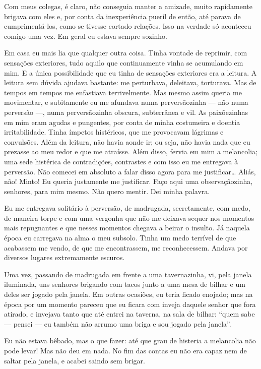 Com meus colegas, é claro, não conseguia manter a amizade, muito
rapidamente brigava com eles e, por conta da inexperiência pueril de
então, até parava de cumprimentá-los, como se tivesse cortado relações.
Isso na verdade só aconteceu comigo uma vez. Em geral eu estava sempre
sozinho.

Em casa eu mais lia que qualquer outra coisa. Tinha vontade de reprimir,
com sensações exteriores, tudo aquilo que continuamente vinha se
acumulando em mim. E a única possibilidade que eu tinha de sensações
exteriores era a leitura. A leitura sem dúvida ajudava bastante: me
perturbava, deleitava, torturava. Mas de tempos em tempos me enfastiava
terrivelmente. Mas mesmo assim queria me movimentar, e subitamente eu
me afundava numa perversãozinha --- não numa perversão ---, numa
perversãozinha obscura, subterrânea e vil. As paixõezinhas em mim eram
agudas e pungentes, por conta de minha costumeira e doentia
irritabilidade. Tinha ímpetos histéricos, que me provocavam lágrimas e
convulsões. Além da leitura, não havia aonde ir; ou seja, não havia
nada que eu prezasse ao meu redor e que me atraísse. Além disso, fervia
em mim a melancolia; uma sede histérica de contradições, contrastes e
com isso eu me entregava à perversão. Não comecei em absoluto a falar
disso agora para me justificar\ldots{} Aliás, não! Minto! Eu queria
justamente me justificar. Faço aqui uma observaçãozinha, senhores, para
mim mesmo. Não quero mentir. Dei minha palavra.

Eu me entregava solitário à perversão, de madrugada, secretamente, com
medo, de maneira torpe e com uma vergonha que não me deixava sequer nos
momentos mais repugnantes e que nesses momentos chegava a beirar o
insulto. Já naquela época eu carregava na alma o meu subsolo. Tinha um
medo terrível de que acabassem me vendo, de que me encontrassem, me
reconhecessem. Andava por diversos lugares extremamente escuros.

Uma vez, passando de madrugada em frente a uma tavernazinha, vi, pela
janela iluminada, uns senhores brigando com tacos junto a uma mesa de
bilhar e um deles ser jogado pela janela. Em outras ocasiões, eu teria
ficado enojado; mas na época por um momento pareceu que eu ficara com
inveja daquele senhor que fora atirado, e invejava tanto que até entrei
na taverna, na sala de bilhar: “quem sabe --- pensei --- eu também não
arrumo uma briga e sou jogado pela janela”.

Eu não estava bêbado, mas o que fazer: até que grau de histeria a
melancolia não pode levar! Mas não deu em nada. No fim das contas eu
não era capaz nem de saltar pela janela, e acabei saindo sem brigar.

